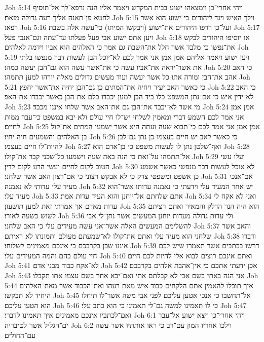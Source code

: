 Joh 5:14  ויהי אחרי־כן וימצאהו ישוע בבית המקדש ויאמר אליו הנה נרפא־לך אל־תוסיף לחטא פן־תאנה אליך רעה גדולה מזאת׃
Joh 5:15  וילך האיש ויגד ליהודים כי־ישוע הוא אשר רפאו׃
Joh 5:16  ועל־כן רדפו היהודים את־ישוע (ויבקשו המיתו) כי־עשה אלה בשבת׃
Joh 5:17  ויען אתם ישוע אבי פעל פעלתו עד־עתה וגם־אנכי פעל׃
Joh 5:18  אז יוסיפו היהודים לבקש את־נפשו כי מלבד אשר חלל את־השבת גם אמר כי האלהים הוא אביו וידמה לאלהים׃
Joh 5:19  ויען ישוע ויאמר אליהם אמן אמן אני אמר לכם לא־יוכל הבן לעשות דבר מנפשו בלתי את אשר־יראה את־אביו עשה כי את־אשר עשה הוא גם־הבן יעשה כמהו׃
Joh 5:20  כי האב אהב את־הבן ומורה אתו כל אשר יעשה ועוד מעשים גדולים מאלה יורהו למען תתמהו׃
Joh 5:21  כי כאשר האב יעיר ויחיה את־המתים כן גם־הבן יחיה את־אשר יחפץ׃
Joh 5:22  כי האב לא־ידין איש כי אם־נתן המשפט כלו ביד הבן למען יכבדו כלם את־הבן כאשר יכבדו את־האב׃
Joh 5:23  מי אשר לא־יכבד את־הבן גם את־האב אשר שלחו איננו מכבד׃
Joh 5:24  אמן אמן אני אמר לכם השמע דברי ומאמין לשלחי יש־לו חיי עולם ולא יבא במשפט כי־עבר ממות לחיים׃
Joh 5:25  אמן אמן אני אמר לכם כי־תבוא שעה ועתה היא אשר ישמעו המתים את־קול בן־האלהים והשמעים חיה יחיו׃
Joh 5:26  כי כאשר לאב יש חיים בעצמו כן נתן גם־לבן להיות־לו חיים בעצמו׃
Joh 5:27  ואף־שלטן נתן לו לעשות משפט כי בן־אדם הוא׃
Joh 5:28  אל־תתמהו על־זאת כי הנה באה שעה וישמעו כל־שכני קבר את־קולו׃
Joh 5:29  ועלו עשי הטוב לקום לחיים ועשי הרע לקום לדין׃
Joh 5:30  לא אוכל לעשות דבר מנפשי כאשר אשמע כן אשפט ומשפטי צדק כי לא אבקש רצוני כי אם־רצון האב אשר שלחני׃
Joh 5:31  אם־אנכי מעיד עלי עדותי לא נאמנה׃
Joh 5:32  יש אחר המעיד עלי וידעתי כי נאמנה עדותו אשר־הוא מעיד עלי׃
Joh 5:33  אתם שלחתם אל־יוחנן והוא העיד עדות אמת׃
Joh 5:34  ואני לא אקח לי עדות מאדם אך אמרתי זאת למען תושעון׃
Joh 5:35  הוא היה הנר הדלק והמאיר ואתם רציתם לשוש כשעה לאורו׃
Joh 5:36  ולי עדות גדולה מעדות יוחנן המעשים אשר נתן־לי אבי להשלימם המעשים האלה אשר־אני עשה מעידים עלי כי האב שלחני׃
Joh 5:37  והאב אשר שלחני הוא מעיד עלי ואתם את־קולו לא־שמעתם מעולם ותמונתו לא ראיתם׃
Joh 5:38  ודברו איננו שכן בקרבכם כי אינכם מאמינים לשלוחו׃
Joh 5:39  דרשו בכתבים אשר תאמרו שיש לכם חיי עולם בהם והמה המעידים עלי׃
Joh 5:40  ואתם אינכם רוצים לבוא אלי להיות לכם חיים׃
Joh 5:41  לא־אקח כבוד מבני אדם׃
Joh 5:42  אכן ידעתי אתכם כי אין־אהבת אלהים בקרבכם׃
Joh 5:43  אני הנה באתי בשם אבי לא קבלתם אתי ואם־יבא אחר בשם עצמו אתו תקבלו׃
Joh 5:44  איך תוכלו להאמין אתם הלקחים כבוד איש מאת רעהו ואת־הכבוד אשר מאת־האלהים היחיד לא תבקשו׃
Joh 5:45  אל־תחשבו כי אנכי אטען עליכם לפני אבי משה אשר־לו תיחלו הוא הטען עליכם׃
Joh 5:46  כי לו תאמינו למשה גם־לי תאמינו כי הוא כתב עלי׃
Joh 5:47  ואם־לכתביו אינכם מאמינים איך תאמינו לדברי׃
Joh 6:1  ויהי אחרי־כן ויצא ישוע אל־עבר ים־הגליל אשר לטיבריה׃
Joh 6:2  וילכו אחריו המון עם־רב כי ראו אותתיו אשר עשה עם־החולים׃
